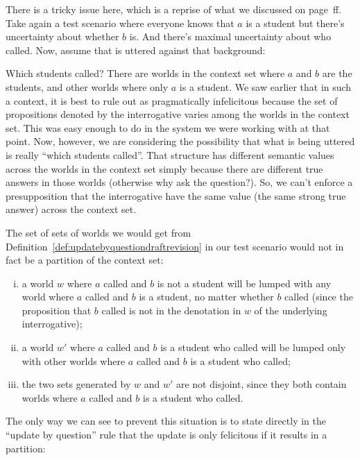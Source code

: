 There is a tricky issue here, which is a reprise of what we discussed on
page~\pageref{par:context-uncertainty}ff. Take again a test scenario where
everyone knows that $a$ is a student but there's uncertainty about whether $b$
is. And there's maximal uncertainty about who called. Now, assume that \Next is
uttered against that background:

\ex Which students called?\xe
%
There are worlds in the context set where $a$ and $b$ are the students, and
other worlds where only $a$ is a student. We saw earlier that in such a context,
it is best to rule \Last out as pragmatically infelicitous because the set of
propositions denoted by the interrogative varies among the worlds in the context
set. This was easy enough to do in the system we were working with at that
point. Now, however, we are considering the possibility that what is being
uttered is really ``\ans which students called''. That structure has different
semantic values across the worlds in the context set simply because there are
different true answers in those worlds (otherwise why ask the question?). %
%
So, we can't enforce a presupposition that the interrogative have the same value
(the same strong true answer) across the context set.

The set of sets of worlds we would get from
Definition~\ref{def:updatebyquestiondraftrevision} in our test scenario would
not in fact be a partition of the context set:

\begin{enumerate}[(i)]
  \item a world $w$ where $a$ called and $b$ is not a student will be lumped
        with any world where $a$ called and $b$ is a student, no matter whether
        $b$ called (since the proposition that $b$ called is not in the
        denotation in $w$ of the underlying interrogative);
  \item a world $w'$ where $a$ called and $b$ is a student who called will be
        lumped only with other worlds where $a$ called and $b$ is a student who
        called;
  \item the two sets generated by $w$ and $w'$ are not disjoint, since they both
        contain worlds where $a$ called and $b$ is a student who called.
\end{enumerate}

The only way we can see to prevent this situation is to state directly in the
``update by question'' rule that the update is only felicitous if it results in
a partition:

